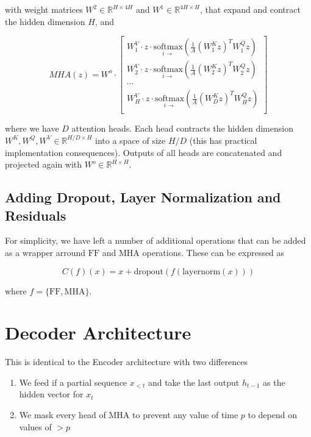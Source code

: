 \noindent with weight matrices $W^2 \in \mathbb{R}^{H \times 4H}$ and $W^1 \in \mathbb{R}^{4H \times H}$, that expand and contract the hidden dimension $H$, and

\begin{equation}
MHA(z) =  W^o \cdot
\begin{bmatrix}
    W^V_1 \cdot z \cdot \underset{i \rightarrow}{\mathrm{softmax}}\left( \frac{1}{A} \left(W^K_1 z\right)^T W^Q_1 z \right)\\
    W^V_2 \cdot z \cdot \underset{i \rightarrow}{\mathrm{softmax}}\left( \frac{1}{A} \left(W^K_2 z\right)^T W^Q_2 z \right)\\
    \cdots\\
    W^V_H \cdot z \cdot \underset{i \rightarrow}{\mathrm{softmax}}\left( \frac{1}{A} \left(W^K_D z\right)^T W^Q_H z \right)\\
\end{bmatrix}\nonumber
\end{equation}

where we have $D$ attention heads. Each head contracts the hidden dimension $W^K, W^Q, W^V \in \mathbb{R}^{H / D \times H}$ into a space of size $H / D$ (this has practical implementation consequences). Outputs of all heads are concatenated and projected again with $W^o \in \mathbb{R}^{H \times H}$.

\subsection{Adding Dropout, Layer Normalization and Residuals}

For simplicity, we have left a number of additional operations that can be added as a wrapper arround $\mathrm{FF}$ and $\mathrm{MHA}$ operations. These can be expressed as

\begin{equation}
C(f)(x) = x + \mathrm{dropout}(f(\mathrm{layernorm}(x)))
\end{equation}

where $f = \{\mathrm{FF}, \mathrm{MHA}\}$.


\section{Decoder Architecture}

This is identical to the Encoder architecture with two differences

\begin{enumerate}
\item We feed if a partial sequence $x_{<t}$ and take the last output $h_{t-1}$ as the hidden vector for $x_t$
\item We mask every head of $\mathrm{MHA}$ to prevent any value of time $p$ to depend on values of $>p$
\end{enumerate}

